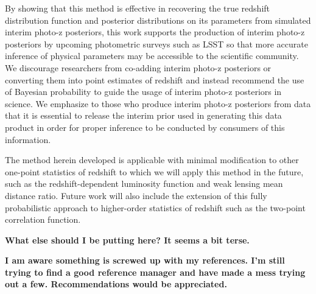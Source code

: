 \documentclass[preprint]{aastex}
\begin{document}
By showing that this method is effective in recovering the true redshift 
distribution function and posterior distributions on its parameters from 
simulated interim photo-z posteriors, this work supports the production of 
interim photo-z posteriors by upcoming photometric surveys such as LSST so that 
more accurate inference of physical parameters may be accessible to the 
scientific community.  We discourage researchers from co-adding interim photo-z 
posteriors or converting them into point estimates of redshift and instead 
recommend the use of Bayesian probability to guide the usage of interim photo-z 
posteriors in science.  We emphasize to those who produce interim photo-z 
posteriors from data that it is essential to release the interim prior used in 
generating this data product in order for proper inference to be conducted by 
consumers of this information.

The method herein developed is applicable with minimal modification to other 
one-point statistics of redshift to which we will apply this method in the 
future, such as the redshift-dependent luminosity function and weak lensing 
mean distance ratio.  Future work will also include the extension of this fully 
probabilistic approach to higher-order statistics of redshift such as the 
two-point correlation function.

\textbf{What else should I be putting here?  It seems a bit terse.}

\clearpage
\textbf{I am aware something is screwed up with my references.  I'm still 
trying to find a good reference manager and have made a mess trying out a few.  
Recommendations would be appreciated.}


\end{document}
